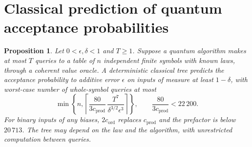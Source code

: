 \documentclass[11pt]{article}
\numberwithin{equation}{section}
\newcommand{\Cgen}{c_{\mathrm{prod}}}
\newcommand{\Cmon}{c_{\mathrm{ord}}}
\theoremstyle{plain}
\newtheorem{proposition}[theorem]{Proposition}
\theoremstyle{remark}
\begin{document}
\section{Classical prediction of quantum acceptance probabilities}\label{sec:queries}

\begin{proposition}\label{prop:T7}
Let $0<\epsilon,\delta<1$ and $T\ge1$. Suppose a quantum algorithm makes at most $T$ queries to a table of $n$ independent finite symbols with known laws, through a coherent value oracle. A deterministic classical tree predicts the acceptance probability to additive error $\epsilon$ on inputs of measure at least $1-\delta$, with worst-case number of whole-symbol queries at most
\begin{equation}\label{eq:T7}
\min\left\{n,\left\lceil\frac{80}{3\Cgen}\,\frac{T^7}{\delta^{3/2}\epsilon^3}\right\rceil\right\},\qquad\frac{80}{3\Cgen}<22\,200 .
\end{equation}
For binary inputs of any biases, $2\Cmon$ replaces $\Cgen$ and the prefactor is below $20\,713$. The tree may depend on the law and the algorithm, with unrestricted computation between queries.
\end{proposition}
\end{document}
